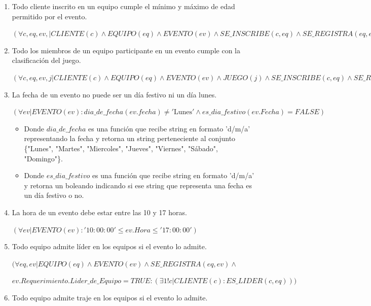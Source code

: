 \documentclass[a4paper,12pt]{article}
\begin{document}
\begin{itemize}
\begin{enumerate}
$(\forall e, t| EVENTO(e) \land ES\_TEMÁTICA(t):(\exists j| JUEGO(j) \land j.Sistema\_Ranking = TRUE : t[EVENTO] = e \land t[JUEGO] = j))$

\item Todo cliente inscrito en un equipo cumple el mínimo y máximo de edad permitido por el evento.

$(\forall c, eq, ev,| CLIENTE(c) \land EQUIPO(eq) \land EVENTO(ev)\land  SE\_INSCRIBE(c, eq)\land SE\_REGISTRA(eq, ev): ev.Rango\_Edad.Min\_Edad \leq c.Edad \leq ev.Rango\_Edad.Max\_Edad)$ 

\item Todo los miembros de un equipo participante en un evento cumple con la clasificación del juego.

$(\forall c, eq, ev, j| CLIENTE(c) \land EQUIPO(eq) \land EVENTO(ev) \land JUEGO(j)\land SE\_INSCRIBE(c, eq) \land SE\_REGISTRA(eq, ev) \land ES\_TEMATICA(j, ev):c.Edad \geq j.Clasificación )$

\item La fecha de un evento no puede ser un día festivo ni un día lunes.

$(\forall ev | EVENTO(ev):dia\_de\_fecha(ev.fecha) \neq '\text{Lunes}' \land es\_dia\_festivo(ev.Fecha) = FALSE)$
\begin{itemize}
\item Donde $dia\_de\_fecha$ es una función que recibe string en formato 'd/m/a' representando la fecha y retorna un string perteneciente al conjunto \{"Lunes", "Martes", "Miercoles", "Jueves", "Viernes", "Sábado", "Domingo"\}.
\item Donde $es\_dia\_festivo$ es una función que recibe string en formato 'd/m/a' y retorna un boleando indicando si ese string que representa una fecha es un día festivo o no.
\end{itemize}

\item La hora de un evento debe estar entre las 10 y 17 horas.

$(\forall ev | EVENTO(ev):'10:00:00' \leq ev.Hora \leq '17:00:00')$
   
\item Todo equipo admite líder en los equipos si el evento lo admite.

$(\forall eq, ev | EQUIPO(eq) \land EVENTO(ev) \land SE\_REGISTRA(eq, ev)\land$

$ev.Requerimiento.Lider\_de\_Equipo = TRUE: (\exists1! c | CLIENTE(c): ES\_LIDER(c, eq)))$ 
   
\item Todo equipo admite traje en los equipos si el evento lo admite.


\end{enumerate}
\end{itemize}
\end{document}
